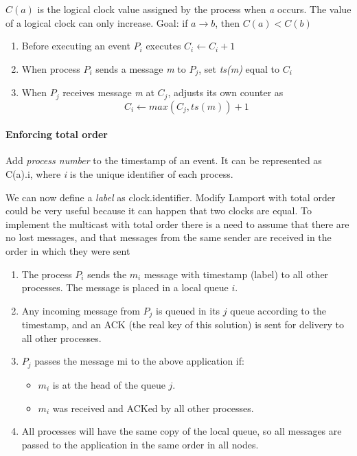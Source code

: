 $C(a)$ is the logical clock value assigned by the process when \textit{a} occurs. The value of a logical clock can only increase. Goal: if $a \rightarrow b$, then $C(a) < C(b)$

\begin{enumerate}
    \item Before executing an event $P_i$ executes $C_i \leftarrow C_i + 1$
    \item When process $P_i$ sends a message \textit{m} to $P_j$, set \textit{ts(m)} equal to $C_i$ 
    \item When $P_j$ receives message \textit{m} at $C_j$, adjusts its own counter as $$C_i \leftarrow max(C_j, ts(m)) + 1$$
\end{enumerate}

\paragraph{Enforcing total order}
Add \textit{process number} to the timestamp of an event. It can be represented as C(a).i, where \textit{i} is the unique identifier of each process.

We can now define a \textit{label} as clock.identifier. Modify Lamport with total order could be very useful because it can happen that two clocks are equal. To implement the multicast with total order there is a need to assume that there are no lost messages, and that messages from the same sender are received in the order in which they were sent
\begin{enumerate}
    \item The process $P_i$ sends the $m_i$ message with timestamp (label) to all other processes. The message is placed in a local queue $i$.
    \item Any incoming message from $P_j$ is queued in its $j$ queue according to the timestamp, and an ACK (the real key of this solution) is sent for delivery to all other processes.
    \item $P_j$ passes the message mi to the above application if:
    \begin{itemize}
        \item $m_i$ is at the head of the queue $j$.
        \item $m_i$ was received and ACKed by all other processes.
    \end{itemize}
    \item All processes will have the same copy of the local queue, so all messages are passed to the application in the same order in all nodes.
\end{enumerate}

\newpage